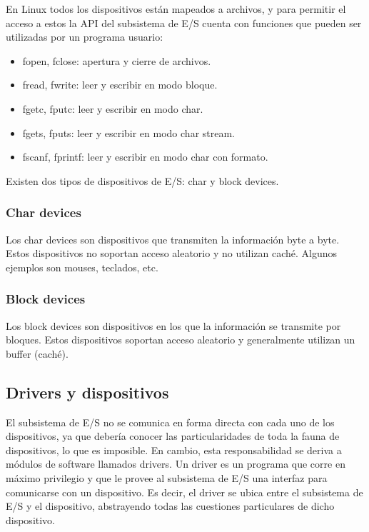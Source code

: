 \documentclass{article}
\begin{document}
En Linux todos los dispositivos están mapeados a archivos, y para permitir el acceso a estos la API del subsistema de E/S cuenta con funciones que pueden ser utilizadas por un programa usuario: 

\begin{itemize}
 \item fopen, fclose: apertura y cierre de archivos.
 \item fread, fwrite: leer y escribir en modo bloque.
 \item fgetc, fputc: leer y escribir en modo char.
 \item fgets, fputs: leer y escribir en modo char stream.
 \item fscanf, fprintf: leer y escribir en modo char con formato.
\end{itemize}


Existen dos tipos de dispositivos de E/S: char y block devices.

\subsubsection{Char devices}

Los char devices son dispositivos que transmiten la informaci\'on byte a byte. Estos dispositivos no soportan acceso aleatorio y no utilizan cach\'e. Algunos ejemplos son mouses, teclados, etc.

\subsubsection{Block devices}

Los block devices son dispositivos en los que la informaci\'on se transmite por bloques. Estos dispositivos soportan acceso aleatorio y generalmente utilizan un buffer (cach\'e).

\subsection{Drivers y dispositivos}

El subsistema de E/S no se comunica en forma directa con cada uno de los dispositivos, ya que debería conocer las particularidades de toda la fauna de dispositivos, lo que es imposible. En cambio, esta responsabilidad se deriva a módulos de software llamados drivers. Un driver es un programa que corre en máximo privilegio y que le provee al subsistema de E/S una interfaz para comunicarse con un dispositivo. Es decir, el driver se ubica entre el subsistema de E/S y el dispositivo, abstrayendo todas las cuestiones particulares de dicho dispositivo.
\end{document}
